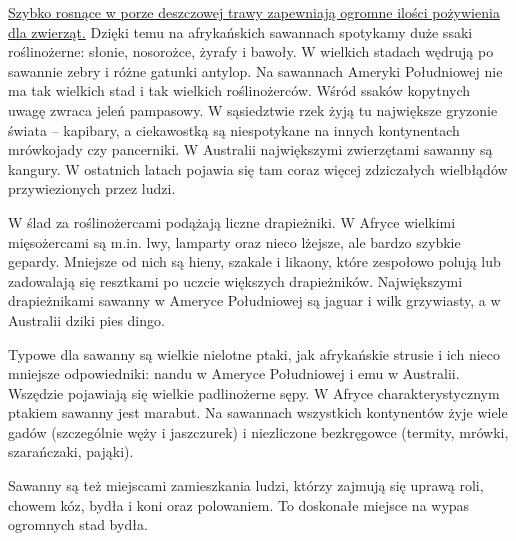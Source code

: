 \documentclass[14pt]{beamer}
\begin{document}
\begin{frame}{\color{black}{Zwierzęta}}

    \tiny   \underline{Szybko rosnące w porze deszczowej trawy zapewniają ogromne ilości pożywienia dla zwierząt.} Dzięki temu na afrykańskich sawannach spotykamy duże ssaki roślinożerne: słonie, nosorożce, żyrafy i bawoły. W wielkich stadach wędrują po sawannie zebry i różne gatunki antylop. Na sawannach Ameryki Południowej nie ma tak wielkich stad i tak wielkich roślinożerców. Wśród ssaków kopytnych uwagę zwraca jeleń pampasowy. W sąsiedztwie rzek żyją tu największe gryzonie świata – kapibary, a ciekawostką są niespotykane na innych kontynentach mrówkojady czy pancerniki. W Australii największymi zwierzętami sawanny są kangury. W ostatnich latach pojawia się tam coraz więcej zdziczałych wielbłądów przywiezionych przez ludzi.

    \tiny   W ślad za roślinożercami podążają liczne drapieżniki. W Afryce wielkimi mięsożercami są m.in. lwy, lamparty oraz nieco lżejsze, ale bardzo szybkie gepardy. Mniejsze od nich są hieny, szakale i likaony, które zespołowo polują lub zadowalają się resztkami po uczcie większych drapieżników. Największymi drapieżnikami sawanny w Ameryce Południowej są jaguar i wilk grzywiasty, a w Australii dziki pies dingo.

    \tiny   Typowe dla sawanny są wielkie nielotne ptaki, jak afrykańskie strusie i ich nieco mniejsze odpowiedniki: nandu w Ameryce Południowej i emu w Australii. Wszędzie pojawiają się wielkie padlinożerne sępy. W Afryce charakterystycznym ptakiem sawanny jest marabut. Na sawannach wszystkich kontynentów żyje wiele gadów (szczególnie węży i jaszczurek) i niezliczone bezkręgowce (termity, mrówki, szarańczaki, pająki).

    \tiny   Sawanny są też miejscami zamieszkania ludzi, którzy zajmują się uprawą roli, chowem kóz, bydła i koni oraz polowaniem. To doskonałe miejsce na wypas ogromnych stad bydła.
    
\end{frame}
\end{document}
